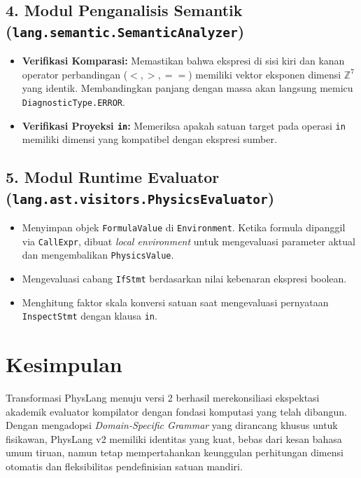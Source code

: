 \documentclass[11pt,a4paper]{article}
\begin{document}
\subsection{4. Modul Penganalisis Semantik (\texttt{lang.semantic.SemanticAnalyzer})}
\begin{itemize}[noitemsep]
    \item \textbf{Verifikasi Komparasi:} Memastikan bahwa ekspresi di sisi kiri dan kanan operator perbandingan ($<, >, ==$) memiliki vektor eksponen dimensi $\mathbb{Z}^7$ yang identik. Membandingkan panjang dengan massa akan langsung memicu \texttt{DiagnosticType.ERROR}.
    \item \textbf{Verifikasi Proyeksi \texttt{in}:} Memeriksa apakah satuan target pada operasi \texttt{in} memiliki dimensi yang kompatibel dengan ekspresi sumber.
\end{itemize}

\subsection{5. Modul Runtime Evaluator (\texttt{lang.ast.visitors.PhysicsEvaluator})}
\begin{itemize}[noitemsep]
    \item Menyimpan objek \texttt{FormulaValue} di \texttt{Environment}. Ketika formula dipanggil via \texttt{CallExpr}, dibuat \textit{local environment} untuk mengevaluasi parameter aktual dan mengembalikan \texttt{PhysicsValue}.
    \item Mengevaluasi cabang \texttt{IfStmt} berdasarkan nilai kebenaran ekspresi boolean.
    \item Menghitung faktor skala konversi satuan saat mengevaluasi pernyataan \texttt{InspectStmt} dengan klausa \texttt{in}.
\end{itemize}

\section{Kesimpulan}
Transformasi PhysLang menuju versi 2 berhasil merekonsiliasi ekspektasi akademik evaluator kompilator dengan fondasi komputasi yang telah dibangun. Dengan mengadopsi \textit{Domain-Specific Grammar} yang dirancang khusus untuk fisikawan, PhysLang v2 memiliki identitas yang kuat, bebas dari kesan bahasa umum tiruan, namun tetap mempertahankan keunggulan perhitungan dimensi otomatis dan fleksibilitas pendefinisian satuan mandiri.
\end{document}
